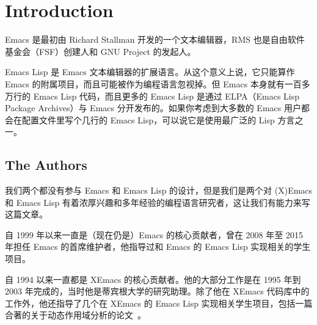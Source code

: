\documentclass[format=acmsmall,screen]{acmart}
\begin{document}





\maketitle

\clearpage
\tableofcontents
\clearpage

\section{Introduction}

Emacs 是最初由 Richard Stallman 开发的一个文本编辑器，RMS 也是自由软件基金会（FSF）创建人和 GNU Project 的发起人。

Emacs Lisp 是 Emacs 文本编辑器的扩展语言。从这个意义上说，它只能算作 Emacs 的附属项目，而且可能被作为编程语言忽视掉。但 Emacs 本身就有一百多万行的 Emacs Lisp 代码，而且更多的 Emacs Lisp 是通过 ELPA（Emacs Lisp Package Archives）与 Emacs 分开发布的。如果你考虑到大多数的 Emacs 用户都会在配置文件里写个几行的 Emacs Lisp，可以说它是使用最广泛的 Lisp 方言之一。


\subsection{The Authors}

我们两个都没有参与 Emacs 和 Emacs Lisp 的设计，但是我们是两个对 (X)Emacs 和 Emacs Lisp 有着浓厚兴趣和多年经验的编程语言研究者，这让我们有能力来写这篇文章。

\smallskip

 自 1999 年以来一直是（现在仍是）Emacs 的核心贡献者，曾在 2008 年至 2015 年担任 Emacs 的首席维护者，他指导过和 Emacs 的 Emacs Lisp 实现相关的学生项目。

\smallskip

 自 1994 以来一直都是 XEmacs 的核心贡献者。他的大部分工作是在 1995 年到 2003 年完成的，当时他是蒂宾根大学的研究助理。除了他在 XEmacs 代码库中的工作外，他还指导了几个在 XEmacs 的 Emacs Lisp 实现相关学生项目，包括一篇合著的关于动态作用域分析的论文~\cite{Neubauer01}。
\end{document}
